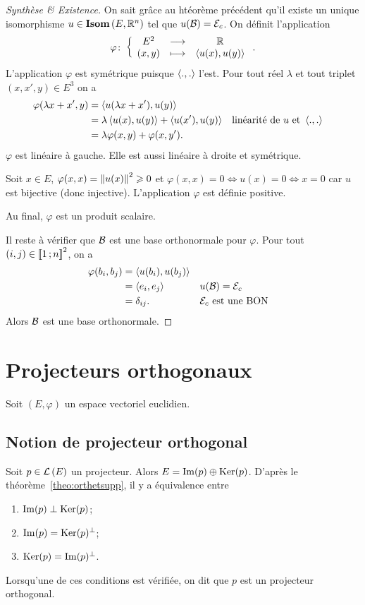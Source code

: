 \begin{proof}[Synthèse \& Existence]
  On sait grâce au htéorème précédent qu'il existe un unique isomorphisme \(u \in \mathbf{Isom}\left(E,\mathbb{R}^n\right)\) tel que \(u(\mathcal{B})=\mathcal{E}_c\). On définit l'application
  \begin{equation}
    \varphi\colon \left\{\begin{array}{ccc} E^2 & \longrightarrow &\mathbb{R}\\ (x,y) & \longmapsto & \left\langle{u(x)},{u(y)}\right\rangle \end{array} \right..
  \end{equation}
  L'application \(\varphi\) est symétrique puisque \(\left\langle{.},{.}\right\rangle\) l'est. Pour tout réel \(\lambda\) et tout triplet \((x,x',y) \in E^3\) on a
  \begin{align}
    \varphi(\lambda x+x',y) &= \left\langle{u(\lambda x+x')},{u(y)}\right\rangle \\
    &=\lambda \left\langle{u(x)},{u(y)}\right\rangle+ \left\langle{u(x')},{u(y)}\right\rangle && \text{linéarité de } u \text{~et~} \left\langle{.},{.}\right\rangle \\
    &=\lambda \varphi(x,y)+ \varphi(x,y').
  \end{align}
  \(\varphi\) est linéaire à gauche. Elle est aussi linéaire à droite et symétrique.

  Soit \(x \in E\), \(\varphi(x,x)=\left\lVert u(x)\right\rVert^2 \geqslant 0\) et \(\varphi(x,x)=0 \iff u(x)=0 \iff x=0\) car \(u\) est bijective (donc injective). L'application \(\varphi\) est définie positive.

  Au final, \(\varphi\) est un produit scalaire.

  Il reste à vérifier que \(\mathcal{B}\) est une base orthonormale pour \(\varphi\). Pour tout \((i,j) \in \mathopen{\llbracket}1\mathclose{}\mathpunct{};n\mathclose{\rrbracket}^2\), on a
  \begin{align}
    \varphi(b_i,b_j) &= \left\langle{u(b_i)},{u(b_j)}\right\rangle \\
    &= \left\langle{e_i},{e_j}\right\rangle && u(\mathcal{B})=\mathcal{E}_c\\
    &=\delta_{ij}. && \mathcal{E}_c \text{~est une BON}
  \end{align}
  Alors \(\mathcal{B}\) est une base orthonormale.
\end{proof}

\section{Projecteurs orthogonaux}

Soit \((E, \varphi)\) un espace vectoriel euclidien.

\subsection{Notion de projecteur orthogonal}

Soit \(p \in \mathcal{L}\left(E\right)\) un projecteur. Alors \(E = \operatorname{Im}(p)\oplus \operatorname{Ker}(p)\). D'après le théorème~\ref{theo:orthetsupp}, il y a équivalence entre
\begin{enumerate}
\item \(\operatorname{Im}(p) \perp \operatorname{Ker}(p)\);
\item \(\operatorname{Im}(p) = \operatorname{Ker}(p)^\perp\);
\item \(\operatorname{Ker}(p) = \operatorname{Im}(p)^\perp\).
\end{enumerate}
Lorsqu'une de ces conditions est vérifiée, on dit que \(p\) est un projecteur orthogonal.

